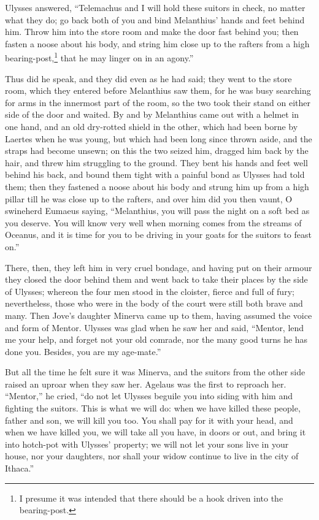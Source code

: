 Ulysses answered, “Telemachus and I will hold these suitors in check, no matter
what they do; go back both of you and bind Melanthius’ hands and feet behind
him. Throw him into the store room and make the door fast behind you; then
fasten a noose about his body, and string him close up to the rafters from a
high bearing-post,\footnote{I presume it was intended that there should be a hook driven into the
bearing-post.} that he may linger on in an agony.”

Thus did he speak, and they did even as he had said; they went to the store
room, which they entered before Melanthius saw them, for he was busy searching
for arms in the innermost part of the room, so the two took their stand on
either side of the door and waited. By and by Melanthius came out with a helmet
in one hand, and an old dry-rotted shield in the other, which had been borne by
Laertes when he was young, but which had been long since thrown aside, and the
straps had become unsewn; on this the two seized him, dragged him back by the
hair, and threw him struggling to the ground. They bent his hands and feet well
behind his back, and bound them tight with a painful bond as Ulysses had told
them; then they fastened a noose about his body and strung him up from a high
pillar till he was close up to the rafters, and over him did you then vaunt, O
swineherd Eumaeus saying, “Melanthius, you will pass the night on a soft bed as
you deserve. You will know very well when morning comes from the streams of
Oceanus, and it is time for you to be driving in your goats for the suitors to
feast on.”

There, then, they left him in very cruel bondage, and having put on their
armour they closed the door behind them and went back to take their places by
the side of Ulysses; whereon the four men stood in the cloister, fierce and
full of fury; nevertheless, those who were in the body of the court were still
both brave and many. Then Jove’s daughter Minerva came up to them, having
assumed the voice and form of Mentor. Ulysses was glad when he saw her and
said, “Mentor, lend me your help, and forget not your old comrade, nor the many
good turns he has done you. Besides, you are my age-mate.”

But all the time he felt sure it was Minerva, and the suitors from the other
side raised an uproar when they saw her. Agelaus was the first to reproach her.
“Mentor,” he cried, “do not let Ulysses beguile you into siding with him and
fighting the suitors. This is what we will do: when we have killed these
people, father and son, we will kill you too. You shall pay for it with your
head, and when we have killed you, we will take all you have, in doors or out,
and bring it into hotch-pot with Ulysses’ property; we will not let your sons
live in your house, nor your daughters, nor shall your widow continue to live
in the city of Ithaca.”

